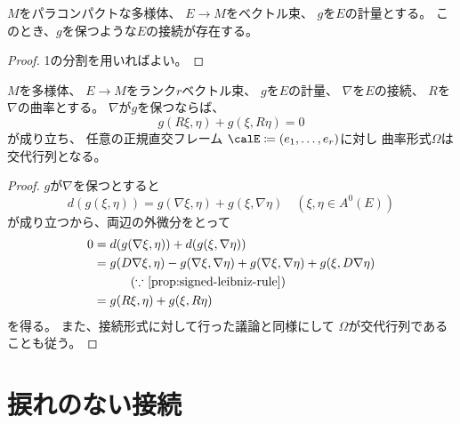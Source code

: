 \documentclass[report]{jlreq}
\begin{document}
\begin{proposition}[計量を保つ接続の存在]
    $M$をパラコンパクトな多様体、
    $E \to M$をベクトル束、
    $g$を$E$の計量とする。
    このとき、$g$を保つような$E$の接続が存在する。
\end{proposition}

\begin{proof}
    1の分割を用いればよい。
    \TODO{}
\end{proof}

\begin{proposition}[曲率形式]
    $M$を多様体、
    $E \to M$をランク$r$ベクトル束、
    $g$を$E$の計量、
    $\nabla$を$E$の接続、
    $R$を$\nabla$の曲率とする。
    $\nabla$が$g$を保つならば、
    \begin{equation}
        g(R\xi, \eta) + g(\xi, R\eta) = 0
    \end{equation}
    が成り立ち、
    任意の正規直交フレーム
    $\calE \coloneqq (e_1, \dots, e_r)$に対し
    曲率形式$\Omega$は交代行列となる。
\end{proposition}

\begin{proof}
    $g$が$\nabla$を保つとすると
    \begin{equation}
        d(g(\xi, \eta)) = g(\nabla \xi, \eta) + g(\xi, \nabla \eta)
            \quad (\xi, \eta \in A^0(E))
    \end{equation}
    が成り立つから、両辺の外微分をとって
    \begin{alignat}{1}
        0 &= d(g(\nabla \xi, \eta)) + d(g(\xi, \nabla \eta)) \\
            &= g(D\nabla \xi, \eta) - g(\nabla \xi, \nabla \eta)
                + g(\nabla \xi, \nabla \eta) + g(\xi, D\nabla \eta) \\
            &\qquad \quad (\text{$\because$ \cref{prop:signed-leibniz-rule}}) \\
            &= g(R \xi, \eta) + g(\xi, R \eta)
    \end{alignat}
    を得る。
    また、接続形式に対して行った議論と同様にして
    $\Omega$が交代行列であることも従う。
\end{proof}

%
\section{捩れのない接続}
\end{document}
